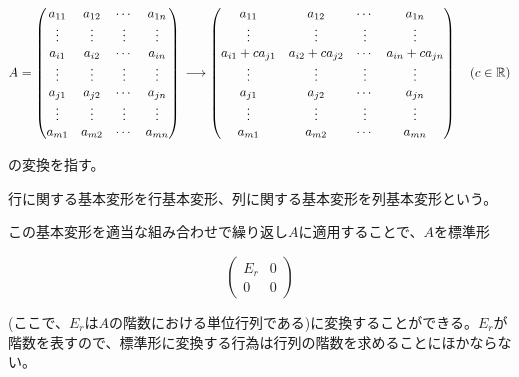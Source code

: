 \documentclass[dvipdfmx,autodetect-engine]{jsarticle}
\theoremstyle{definition}
\begin{document}
\begin{enumerate}
$$
A = \begin{pmatrix}
a_{11} & a_{12} & \cdots & a_{1n} \\
\vdots & \vdots & \vdots & \vdots \\
a_{i1} & a_{i2} & \cdots & a_{in} \\
\vdots & \vdots & \vdots & \vdots \\
a_{j1} & a_{j2} & \cdots & a_{jn} \\
\vdots & \vdots & \vdots & \vdots \\
a_{m1} & a_{m2} & \cdots & a_{mn} \\
\end{pmatrix} \\
\longrightarrow \begin{pmatrix}
a_{11} & a_{12} & \cdots & a_{1n} \\
\vdots & \vdots & \vdots & \vdots \\
a_{i1} + ca_{j1} & a_{i2} + ca_{j2} & \cdots & a_{in} + ca_{jn} \\
\vdots & \vdots & \vdots & \vdots \\
a_{j1} & a_{j2} & \cdots & a_{jn} \\
\vdots & \vdots & \vdots & \vdots \\
a_{m1} & a_{m2} & \cdots & a_{mn} \\
\end{pmatrix} \quad (c \in \mathbb{R})
$$

の変換を指す。
\end{enumerate}

行に関する基本変形を行基本変形、列に関する基本変形を列基本変形という。

この基本変形を適当な組み合わせで繰り返し$A$に適用することで、$A$を標準形

$$
\begin{pmatrix}
E_r & 0 \\
0 & 0
\end{pmatrix}
$$


(ここで、$E_r$は$A$の階数における単位行列である)に変換することができる。$E_r$が階数を表すので、標準形に変換する行為は行列の階数を求めることにほかならない。


\end{document}

